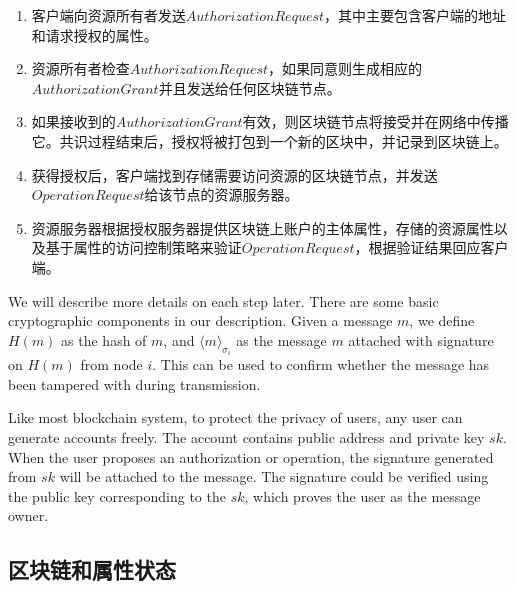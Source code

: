 \begin{enumerate}
  \item 客户端向资源所有者发送$Authorization Request$，其中主要包含客户端的地址和请求授权的属性。
  \item 资源所有者检查$Authorization Request$，如果同意则生成相应的$Authorization Grant$并且发送给任何区块链节点。
  \item 如果接收到的$Authorization Grant$有效，则区块链节点将接受并在网络中传播它。共识过程结束后，授权将被打包到一个新的区块中，并记录到区块链上。
  \item 获得授权后，客户端找到存储需要访问资源的区块链节点，并发送$Operation Request$给该节点的资源服务器。
  \item 资源服务器根据授权服务器提供区块链上账户的主体属性，存储的资源属性以及基于属性的访问控制策略来验证$Operation Request$，根据验证结果回应客户端。
\end{enumerate}

We will describe more details on each step later. There are some basic cryptographic components in our description. Given a message $m$, we define $H(m)$ as the hash of $m$, and $\langle m \rangle_{\sigma_{i}}$ as the message $m$ attached with signature on $H(m)$ from node $i$. This can be used to confirm whether the message has been tampered with during transmission.

Like most blockchain system, to protect the privacy of users, any user can generate accounts freely. The account contains public address and private key $sk$. When the user proposes an authorization or operation, the signature generated from $sk$ will be attached to the message. The signature could be verified using the public key corresponding to the $sk$, which proves the user as the message owner.


\subsection{区块链和属性状态}

